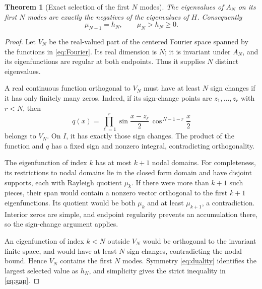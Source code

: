 \documentclass[10pt]{article}
\newtheorem{theorem}{Theorem}
\begin{document}
\begin{theorem}[Exact selection of the first $N$ modes]
The eigenvalues of $A_N$ on its first $N$ modes are exactly the
negatives of the eigenvalues of $H$. Consequently
\begin{equation}
\mu_{N-1}=h_N,\qquad \mu_N>h_N\ge0.
\label{eq:gap}
\end{equation}
\end{theorem}
\begin{proof}
Let $V_N$ be the real-valued part of the centered Fourier space
spanned by the functions in \eqref{eq:Fourier}. Its real dimension is
$N$; it is invariant under $A_N$, and its eigenfunctions are regular
at both endpoints. Thus it supplies $N$ distinct eigenvalues.

A real continuous function orthogonal to $V_N$ must have at least $N$
sign changes if it has only finitely many zeros.
Indeed, if its sign-change points are $z_1,\ldots,z_r$ with $r<N$, then
\[
q(x)=\prod_{\ell=1}^{r}\sin\frac{x-z_\ell}{2}\,
                 \cos^{\,N-1-r}\frac{x}{2}
\]
belongs to $V_N$. On $I$, it has exactly those sign changes.
The product of the function and $q$ has a fixed sign and nonzero integral,
contradicting orthogonality.

The eigenfunction of index $k$ has at most $k+1$ nodal domains.
For completeness, its restrictions to nodal domains lie in the closed
form domain and have disjoint supports, each with Rayleigh quotient
$\mu_k$. If there were more than $k+1$ such pieces, their span would
contain a nonzero vector orthogonal to the first $k+1$ eigenfunctions.
Its quotient would be both $\mu_k$ and at least $\mu_{k+1}$, a
contradiction. Interior zeros are simple, and endpoint regularity
prevents an accumulation there, so the sign-change argument applies.

An eigenfunction of index $k<N$ outside $V_N$ would be orthogonal to
the invariant finite space, and would have at least $N$ sign changes,
contradicting the nodal bound. Hence $V_N$ contains the first $N$ modes.
Symmetry \eqref{eq:duality} identifies the largest selected value as
$h_N$, and simplicity gives the strict inequality in \eqref{eq:gap}.
\end{proof}
\end{document}
